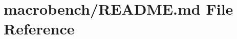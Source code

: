 \hypertarget{macrobench_2README_8md}{}\section{macrobench/\+R\+E\+A\+D\+ME.md File Reference}
\label{macrobench_2README_8md}
